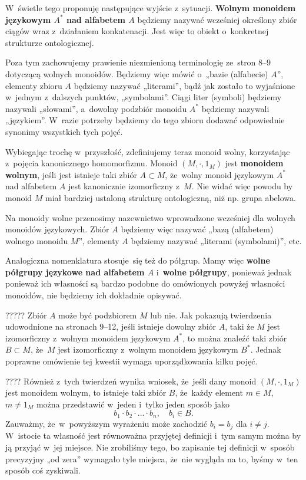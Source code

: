 \documentclass[a4paper,11pt]{article}
\begin{document}
W~świetle tego proponuję następujące wyjście z~sytuacji.
\textbf{Wolnym monoidem językowym $A^{ * }$ nad alfabetem $A$}
będziemy nazywać wcześniej określony zbiór ciągów wraz z~działaniem
konkatenacji. Jest więc to obiekt o~konkretnej strukturze
ontologicznej.

Poza tym zachowujemy prawienie niezmienioną terminologię ze~stron 8--9
dotyczącą wolnych monoidów. Będziemy więc mówić o~„bazie (alfabecie) $A$”,
elementy zbioru $A$ będziemy nazywać „literami”, bądź jak zostało to
wyjaśnione w~jednym z~dalszych punktów, „symbolami”. Ciągi liter (symboli)
będziemy nazywali „słowami”, a~dowolny podzbiór monoidu $A^{ * }$ będziemy
nazywali „językiem”. W~razie potrzeby będziemy do tego zbioru dodawać
odpowiednie synonimy wszystkich tych pojęć.

Wybiegając trochę w~przyszłość, zdefiniujemy teraz monoid wolny, korzystając
z~pojęcia kanonicznego homomorfizmu. Monoid $( M, \cdot, 1_{ M } )$ jest
\textbf{monoidem wolnym}, jeśli jest istnieje taki zbiór $A \subset M$, że~wolny
monoid językowym $A^{ * }$ nad alfabetem $A$ jest kanonicznie izomorficzny
z~$M$. Nie widać więc powodu by monoid $M$ miał bardziej ustaloną strukturę
ontologiczną, niż np. grupa abelowa.

Na monoidy wolne przenosimy nazewnictwo wprowadzone wcześniej dla wolnych
monoidów językowych. Zbiór $A$ będziemy więc nazywać „bazą (alfabetem)
wolnego monoidu $M$”, elementy $A$ będziemy nazywać „literami (symbolami)”,
etc.

Analogiczna nomenklatura stosuje~się też do półgrup. Mamy więc \textbf{wolne
  półgrupy językowe nad alfabetem $A$} i~\textbf{wolne półgrupy}, ponieważ
jednak ponieważ ich własności są bardzo podobne do omówionych powyżej
własności monoidów, nie będziemy ich dokładnie opisywać.

????? Zbiór $A$ może być podzbiorem
$M$ lub nie. Jak pokazują twierdzenia udowodnione na stronach 9--12,
jeśli istnieje dowolny zbiór $A$, taki że $M$ jest izomorficzny
z~wolnym monoidem językowym $A^{ * }$, to można znaleźć taki zbiór
$B \subset M$, że~$M$ jest izomorficzny z~wolnym monoidem językowym
$B^{ * }$. Jednak poprawne omówienie tej kwestii wymaga uporządkowania
kilku pojęć.

???? Również z~tych twierdzeń wynika wniosek, że~jeśli dany monoid
$( M, \cdot, 1_{ M } )$ jest monoidem wolnym, to istnieje taki zbiór
$B$, że~każdy element $m \in M$, $m \neq 1_{ M }$ można przedstawić
w~jeden i~tylko jeden sposób jako
\begin{equation}
  \label{eq:Forys-Forys-04}
  b_{ 1 } \cdot b_{ 2 } \cdot \ldots \cdot b_{ n }, \quad
  b_{ i } \in B.
\end{equation}
Zauważmy, że~w~powyższym wyrażeniu może zachodzić $b_{ i } = b_{ j }$
dla $i \neq j$. W~istocie ta własność jest równoważna przyjętej
definicji i~tym samym można by ją przyjąć w~jej miejsce. Nie
zrobiliśmy tego, bo zapisanie tej definicji w~sposób precyzyjny „od
zera” wymagało tyle miejsca, że~nie wygląda na to, byśmy w~ten sposób
coś zyskiwali.
\end{document}
